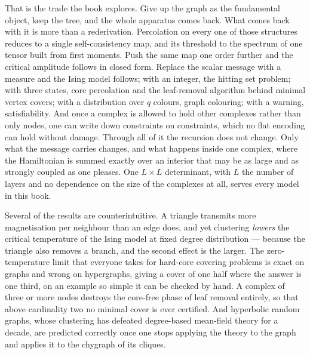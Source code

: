 That is the trade the book explores. Give up the graph as the fundamental
object, keep the tree, and the whole apparatus comes back. What comes back with
it is more than a rederivation. Percolation on every one of those structures
reduces to a single self-consistency map, and its threshold to the spectrum of
one tensor built from first moments. Push the same map one order further and the
critical amplitude follows in closed form. Replace the scalar message with a
measure and the Ising model follows; with an integer, the hitting set problem;
with three states, core percolation and the leaf-removal algorithm behind minimal
vertex covers; with a distribution over $q$ colours, graph colouring; with a
warning, satisfiability. And once a complex is allowed to hold other complexes
rather than only nodes, one can write down constraints on constraints, which no
flat encoding can hold without damage. Through all of it the recursion does not
change. Only what the
message carries changes, and what happens inside one complex, where the
Hamiltonian is summed exactly over an interior that may be as large and as
strongly coupled as one pleases. One $L\times L$ determinant, with $L$ the number
of layers and no dependence on the size of the complexes at all, serves every
model in this book.

Several of the results are counterintuitive. A triangle transmits more
magnetisation per neighbour than an edge does, and yet clustering \emph{lowers} the critical
temperature of the Ising model at fixed degree distribution --- because the
triangle also removes a branch, and the second effect is the larger. The
zero-temperature limit that everyone takes for hard-core covering problems is
exact on graphs and wrong on hypergraphs, giving a cover of one half where the
answer is one third, on an example so simple it can be checked by hand. A
complex of three or more nodes destroys the core-free phase of leaf removal
entirely, so that above cardinality two no minimal cover is ever certified. And
hyperbolic random graphs, whose clustering has defeated degree-based mean-field
theory for a decade, are predicted correctly once one stops applying the theory
to the graph and applies it to the chygraph of its cliques.

